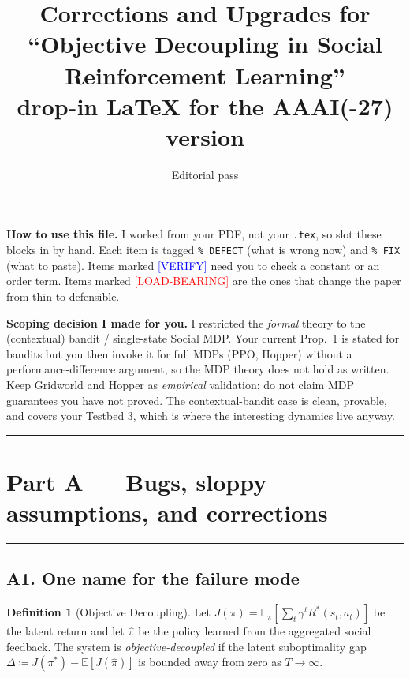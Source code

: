 \documentclass[11pt]{article}
\title{Corrections and Upgrades for \\ ``Objective Decoupling in Social Reinforcement Learning'' \\ \large drop-in LaTeX for the AAAI(-27) version}
\author{Editorial pass}
\date{}
\theoremstyle{definition}
\newtheorem{definition}{Definition}
\theoremstyle{remark}
\newcommand{\Rstar}{R^{\ast}}
\newcommand{\E}{\mathbb{E}}
\begin{document}
\maketitle

\noindent\textbf{How to use this file.}
I worked from your PDF, not your \texttt{.tex}, so slot these blocks in by hand.
Each item is tagged \texttt{\% DEFECT} (what is wrong now) and \texttt{\% FIX} (what to paste).
Items marked \textcolor{blue}{[VERIFY]} need you to check a constant or an order term.
Items marked \textcolor{red}{[LOAD-BEARING]} are the ones that change the paper from thin to defensible.

\medskip
\noindent\textbf{Scoping decision I made for you.}
I restricted the \emph{formal} theory to the (contextual) bandit / single-state Social MDP.
Your current Prop.~1 is stated for bandits but you then invoke it for full MDPs (PPO, Hopper) without a performance-difference argument, so the MDP theory does not hold as written.
Keep Gridworld and Hopper as \emph{empirical} validation; do not claim MDP guarantees you have not proved.
The contextual-bandit case is clean, provable, and covers your Testbed 3, which is where the interesting dynamics live anyway.

\bigskip
\hrule
\section*{Part A --- Bugs, sloppy assumptions, and corrections}
\hrule

\subsection*{A1. One name for the failure mode}

\begin{definition}[Objective Decoupling]
\label{def:decoupling}
Let $J(\pi)=\E_{\pi}\!\left[\sum_t \gamma^t \Rstar(s_t,a_t)\right]$ be the latent return and let
$\hat\pi$ be the policy learned from the aggregated social feedback.
The system is \emph{objective-decoupled} if the latent suboptimality gap
$\Delta \coloneqq J(\pi^{\ast}) - \E[J(\hat\pi)]$ is bounded away from zero as $T\to\infty$.
\end{definition}
\end{document}
